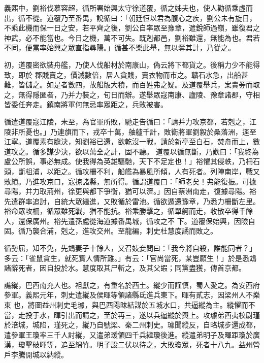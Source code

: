 \begin{pinyinscope}
 義熙中，劉裕伐慕容超，循所署始興太守徐道覆，循之姊夫也，使人勸循乘虛而出，循不從。道覆乃至番禺，說循曰：「朝廷恒以君為腹心之疾，劉公未有旋日，不乘此機而保一日之安，若平齊之後，劉公自率眾至豫章，遣銳師過嶺，雖復君之神武，必不能當也。今日之機，萬不可失。既剋都邑，劉裕雖還，無能為也。君若不同，便當率始興之眾直指尋陽。」循甚不樂此舉，無以奪其計，乃從之。



 初，道覆密欲裝舟艦，乃使人伐船材於南康山，偽云將下都貨之。後稱力少不能得致，即於
 郡賤賣之，價減數倍，居人貪賤，賣衣物而市之。贛石水急，出船甚難，皆儲之。如是者數四，故船版大積，而百姓弗之疑。及道覆舉兵，案賣券而取之，無得隱匿者，乃并力裝之，旬日而辦。遂舉眾寇南康、廬陵、豫章諸郡，守相皆委任奔走。鎮南將軍何無忌率眾距之，兵敗被害。



 循遣道覆寇江陵，未至，為官軍所敗，馳走告循曰：「請并力攻京都，若剋之，江陵非所憂也。」乃連旗而下，戎卒十萬，舳艫千計，敗衛將軍劉毅於桑落洲，逕至江寧。道覆素有膽決，知劉裕已還，欲乾沒一戰，請於新亭至白石，焚舟而上，數道攻之。循多謀少決，欲以萬全之計，固不聽。
 道覆以循無斷，乃歎曰：「我終為盧公所誤，事必無成。使我得為英雄驅馳，天下不足定也！」裕懼其侵軼，乃柵石頭，斷柤浦，以距之。循攻柵不利，船艦為暴風所傾，人有死者。列陣南岸，戰又敗績。乃進攻京口，寇掠諸縣，無所得。循謂道覆曰：「師老矣！弗能復振。可據尋陽，并力取荊州，徐更與都下爭衡，猶可以濟。」因自蔡洲南走，復據尋陽。裕先遣群率追討，自統大眾繼進，又敗循於雷池。循欲遁還豫章，乃悉力柵斷左里。裕命眾攻柵，循眾雖死戰，猶不能抗。裕乘勝擊之，循單舸而走，收散卒得千餘人，還保廣州。裕先遣孫處從海道據番禺城，循攻之不
 下。道覆保始興，因險自固。循乃襲合浦，剋之，進攻交州。至龍編，刺史杜慧度譎而敗之。



 循勢屈，知不免，先鴆妻子十餘人，又召妓妾問曰：「我今將自殺，誰能同者？」多云：「雀鼠貪生，就死實人情所難。」有云：「官尚當死，某豈願生！」於是悉鴆諸辭死者，因自投於水。慧度取其尸斬之，及其父嘏；同黨盡獲，傳首京都。



 譙縱，巴西南充人也。祖獻之，有重名於西土。縱少而謹慎，蜀人愛之。為安西府參軍。義熙元年，刺史遣縱及侯暉等領諸縣氐進兵東下。暉有貳志，因梁州人不樂東
 也，將圖益州刺史毛璩，與巴西陽昧結謀於五城水口，共逼縱為主。縱懼而不當，走投于水，暉引出而請之，至於再三，遂以兵逼縱於輿上。攻璩弟西夷校尉瑾於涪城，城陷，瑾死之，縱乃自號梁、秦二州刺史。璩聞縱反，自略城步還成都，遣參軍王瓊率三千人討縱，又遣弟瑗領四千兵繼瓊後進。縱遣弟明子及暉距瓊於廣漢，瓊擊破暉等，追至綿竹。明子設二伏以待之，大敗瓊眾，死者十八九。益州營戶李騰開城以納縱。




\end{pinyinscope}
